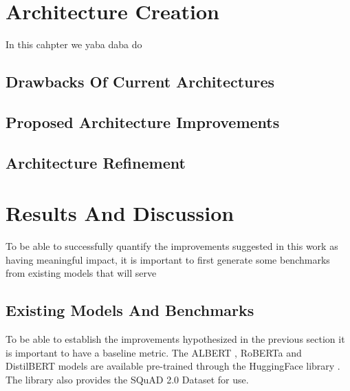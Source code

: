 \documentclass[a4paper,12pt]{report}
\begin{document}
  \chapter{Architecture Creation}\label{c4}

     In this cahpter we yaba daba do
       \section{Drawbacks Of Current Architectures}\label{c42}
       \section{Proposed Architecture Improvements}\label{c43}
       \section{Architecture Refinement}\label{c44}

    \chapter{Results And Discussion}\label{c5}
    To be able to successfully quantify the improvements suggested in this work as having meaningful impact, it is important to first generate some benchmarks from existing models that will serve
     \section{Existing Models And Benchmarks}\label{c41}

    To be able to establish the improvements hypothesized in the previous section it is important to have a baseline metric. The ALBERT \citep{albert}, RoBERTa \citep{roberta} and DistilBERT \citep{distil} models are available pre-trained through the HuggingFace library \citep{hfTransformers}. The library also provides the SQuAD 2.0 Dataset \citep{dataset} for use.
\end{document}
